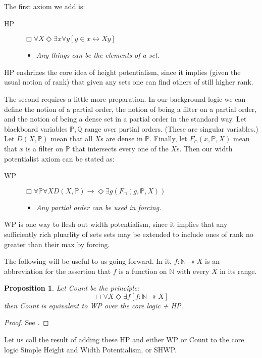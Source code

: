 \documentclass{article}
\newtheorem{proposition}[theorem]{Proposition}
\begin{document}
The first axiom we add is:
\begin{description}
    \item[HP] $\Box \forall X \Diamond \exists x \forall y[y \in x \leftrightarrow Xy]$
    \begin{itemize} 
    \item \emph{Any things can be the elements of a set.}
    \end{itemize}
\end{description}
HP enshrines the core idea of height potentialism, since it implies (given the
usual notion of rank) that given any sets one can find others of still higher rank.

The second requires a little more preparation. In our background logic we 
can define the notion of a partial order, the notion of being a filter on 
a partial order, and the notion of being a dense set in a partial order in 
the standard way. Let blackboard variables $\mathbb{P}, \mathbb{Q}$ range over 
partial orders. (These are singular variables.) Let $D(X, \mathbb{P})$ mean 
that all $X$s are dense in $\mathbb{P}$. Finally, let $F_\cap(x, \mathbb{P}, X)$ 
mean that $x$ is a filter on $\mathbb{P}$ that intersects every one of the $X$s.
Then our width potentialist axiom can be stated as:
\begin{description}
    \item[WP] $\Box \forall \mathbb{P} \forall X D(X, \mathbb{P}) \rightarrow \Diamond \exists g(F_\cap(g, \mathbb{P}, X)) $   \begin{itemize} 
    \item \emph{Any partial order can be used in forcing.}
    \end{itemize}
\end{description}
WP is one way to flesh out width potentialism, since it implies that any 
sufficiently rich pluarlity of sets
sets may be extended to include ones of rank no greater than their max by 
forcing. 

The following will be useful to us going forward. In it, $f : \mathbb{N} \twoheadrightarrow X$
is an abbreviation for the assertion that $f$ is a function on $\mathbb{N}$ with every $X$ in its range.

\begin{proposition}\label{SHWP0}
    Let Count  be the principle:
    $$\Box \forall X \Diamond \exists f[f : \mathbb{N} \twoheadrightarrow X] $$ 
    then Count is equivalent to WP over the core logic + HP.
\end{proposition}
\begin{proof}
    See \cite{CS2021}.
\end{proof}
Let us call the result of adding these HP and either WP or Count
 to the core logic 
 Simple Height and Width Potentialism, or SHWP.
\end{document}
